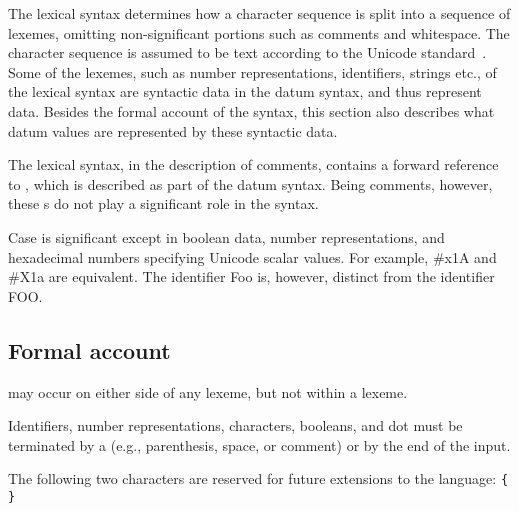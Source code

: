 The lexical syntax determines how a character sequence is split into a
sequence of lexemes, omitting non-significant portions
such as comments and whitespace.  The character sequence is assumed to
be text according to the Unicode standard~\cite{Unicode}.  Some of
the lexemes, such as number representations, identifiers, strings etc., of the lexical
syntax are syntactic data in the datum syntax, and thus represent data.
Besides the formal account of the syntax, this section also describes
what datum values are represented by these syntactic data.

The lexical syntax, in the description of comments, contains
a forward reference to , which is described as part of the
datum syntax.  Being comments, however, these s do not play
a significant role in the syntax.

Case is significant except in boolean data, number representations, and
hexadecimal numbers specifying Unicode scalar values.  For example, {\cf \#x1A}
and {\cf \#X1a} are equivalent.  The identifier {\cf Foo} is, however,
distinct from the identifier {\cf FOO}.

\subsection{Formal account}
\label{lexicalgrammarsection}

 may occur on either side of any lexeme, but not
within a lexeme.

\vest Identifiers, number representations, characters, booleans, and dot must be terminated
by a  (e.g., parenthesis, space, or comment) or by the
end of the input.

The following two characters are reserved for future extensions to the
language: {\tt \verb"{" \verb"}"}

